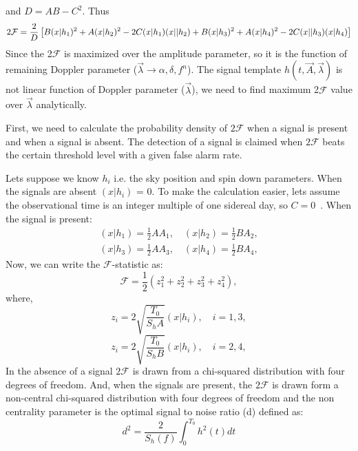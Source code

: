 \documentclass{ttuthes2007}
\begin{document}
and $D=AB-C^2$. Thus
\begin{equation}
\small
2\mathcal{F}=\frac{2}{D}\left[B(x|h_1)^2 + A(x|h_2)^2 -2C(x|h_1)(x||h_2)+
B(x|h_3)^2 + A(x|h_4)^2 -2C(x||h_3)(x|h_4)\right]
\end{equation}
Since the 2$\mathcal{F}$ is maximized over the amplitude parameter, so it is the
function of remaining Doppler parameter ($\vec{\lambda}\rightarrow \alpha,\delta,f^n$). The signal
template $h(t,\vec{A},\vec{\lambda})$ is not linear function of Doppler
parameter ($\vec{\lambda}$), we need to find maximum 2$\mathcal{F}$ value over
$\vec{\lambda}$ analytically. 

First, we need to calculate the probability density of $2\mathcal{F}$ when a
signal is present and when a signal is absent. The detection of a signal is claimed
when $2\mathcal{F}$ beats the certain threshold level with a given false alarm
rate. 

Lets suppose we know $h_i$ i.e. the sky position and spin down parameters. When
the signals are absent $(x|h_i)$ = 0. To make the calculation easier, lets
assume the observational time is an integer multiple of one sidereal day, so $C
= 0$~\cite{Jaranowski_2000}. When the signal is present:
\begin{align*}
(x|h_1)= \frac{1}{2}AA_1, \quad (x|h_2) = \frac{1}{2}B A_2,\\
(x|h_3)= \frac{1}{2}AA_3, \quad (x|h_4) = \frac{1}{2}B A_4,
\end{align*}
Now, we can write the $\mathcal{F}$-statistic as:
\begin{equation}
\mathcal{F} = \frac{1}{2}(z_1^2+z_2^2+z_3^2+z_4^2),
\end{equation}
where,
\begin{equation}
z_i=2\sqrt{\frac{T_0}{S_hA}}(x|h_i), \quad i=1,3,
\end{equation}
\begin{equation}
z_i=2\sqrt{\frac{T_0}{S_hB}}(x|h_i), \quad i=2,4,
\end{equation}
In the absence of a signal $2\mathcal{F}$ is drawn from a chi-squared distribution with four
degrees of freedom. And, when the signals are present, the $2\mathcal{F}$ is
drawn form a
non-central chi-squared distribution with four degrees of freedom and the non
centrality parameter is the optimal signal to noise ratio (d) defined as:
\begin{equation}
d^2=\frac{2}{S_h(f)}\int_0^{T_0} h^2(t)dt
\end{equation}
\end{document}
